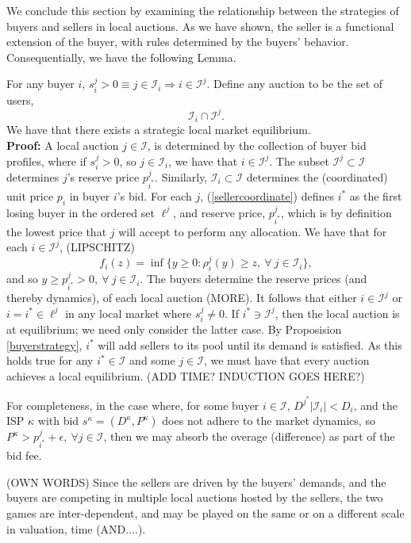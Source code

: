 \documentclass[12pt]{article}
\theoremstyle{definition}
\newcommand{\mcI}{\mathcal{I}}
\begin{document}
\begin{multicols}{2}
We conclude this section by examining the relationship between the strategies of buyers and
sellers in local auctions. As we have shown, the seller
is a functional extension of the buyer, with rules determined by the buyers'
behavior. Consequentially, we have the following Lemma.

{
For any buyer $i$, $s_i^j > 0 \equiv j\in\mcI_i \Rightarrow i\in\mcI^j$. 
Define any auction to be the set of users,
\begin{equation}
    \mcI_i \cap \mcI^j.
\end{equation}
We have that there exists a strategic local market equilibrium.
}\\
\textbf{Proof:}
A local auction $j\in\mcI$, is determined by the collection of buyer bid
profiles, where if $s_i^j > 0$, so $j\in\mcI_i$, we have that $i\in\mcI^j$. 
The subset $\mcI^j \subset \mcI$
determines $j$'s reserve price $p_{i^*}^j$. Similarly, $\mcI_i\subset \mcI$ 
determines the (coordinated) unit price $p_{i}$ in buyer $i$'s bid.
 For each $j$,
(\ref{sellercoordinate}) defines $i^*$ as the first losing buyer in the ordered
set $\ell^j$, and reserve price, $p_{i^*}^j$, which is by definition the lowest price that $j$
will accept to perform any allocation. 
We have that for each $i \in \mcI^j$, (LIPSCHITZ)
$$
   f_i(z) = \inf\bigg\lbrace y \ge 0 : \rho_i^j(y) \ge z,\
\forall \ j\in\mcI_i\bigg\rbrace,
$$
and so $y\ge p_{i^*}^j > 0, \ \forall \ j\in\mcI_i$.
The buyers determine the reserve prices (and thereby dynamics), of each local
auction (MORE). 
It follows that either $i\in\mcI^j$ or $i = i^* \in \ell^j$ in any local market
where $s_i^j \ne 0$. If $i^* \ni \mcI^j$, then the local auction is at
equilibrium; we need only consider the latter case. By
Proposision \ref{buyerstrategy}, $i^*$
will add sellers to its pool until its demand is satisfied. As this holds true
for any $i^* \in \mcI$ and some $j\in\mcI$, we must have that every auction
achieves a local equilibrium. 
(ADD TIME? INDUCTION GOES HERE?)

For completeness, in the case where, for some buyer $i\in \mcI$, $D^{j^*}\vert
\mcI_i\vert < D_i$, and the ISP $\kappa$ with bid $s^\kappa =(D^\kappa,
P^\kappa)$ does not adhere to the market dynamics, so $P^\kappa > p_{i^*}^j +
\epsilon, \ \forall j \in\mcI$, then we may absorb the overage (difference) as part of the
bid fee.

(OWN
WORDS) Since the sellers are driven by the buyers' demands, and the buyers are
competing in multiple local auctions hosted by the sellers, the two games are
inter-dependent, and may be played on the same or on a different scale in
valuation, time (AND....). 



\end{multicols}
\end{document}
